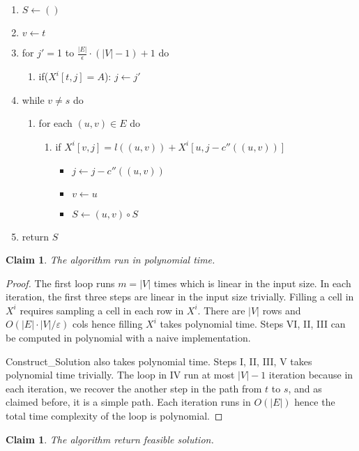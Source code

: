 \documentclass{article}
\newtheorem{claim}[section]{Claim}
\begin{document}
\begin{enumerate}
\begin{enumerate}[I]
	\item $S\leftarrow ()$
	\item $v\leftarrow t$
	\item for $j' = $1 to $ \frac{|E|}{\epsilon} \cdot (|V|-1) +1$ do
	\begin{enumerate}\item if($X^i[t,j] = A$): $j\leftarrow j'$
\end{enumerate}
	\item while $v\ne s$ do
	\begin{enumerate}
		\item for each $(u,v)\in E$ do
		\begin{enumerate}
			\item if $ X^i[v,j] = l((u,v)) + X^i[u,j-c''((u,v))]$
			\begin{itemize}
				\item $j\leftarrow j-c''((u,v))$
				\item $v \leftarrow u$
				\item $S\leftarrow (u,v)\circ S$
			\end{itemize}
		\end{enumerate}
	\end{enumerate}
	\item return $S$
\end{enumerate}
\begin{claim} The algorithm run in polynomial time.
\end{claim}
\begin{proof}
	The first loop runs $m = |V|$ times which is linear in the input size. In each iteration, the first three steps are linear in the input size trivially. Filling a cell in $X^i$ requires sampling a cell in each row in $X^i$. There are $|V|$ rows and $O(|E| \cdot |V| / \varepsilon)$ cols hence filling $X^i$ takes polynomial time.
	Steps VI, II, III can be computed in polynomial with a naive implementation. 
	
	Construct\_Solution also takes polynomial time. Steps I, II, III, V takes polynomial time trivially. The loop in IV run at most $|V| - 1$ iteration because in each iteration, we recover the another step in the path from $t$ to $s$, and as claimed before, it is a simple path. Each iteration runs in $O(|E|)$ hence the total time complexity of the loop is polynomial.
\end{proof}
\begin{claim} The algorithm return feasible solution.
\end{claim}


\end{enumerate}
\end{document}
